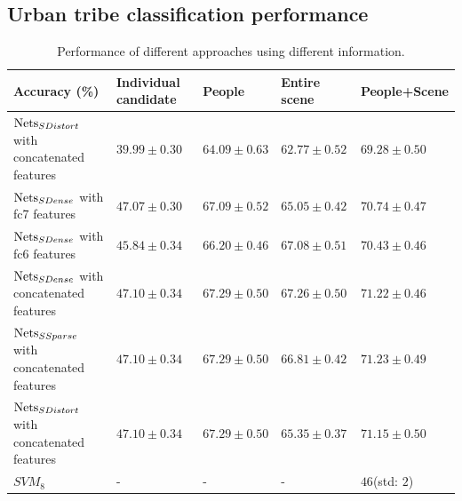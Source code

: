 \documentclass[10pt,twocolumn,letterpaper]{article}
\begin{document}
\subsection{Urban tribe classification performance}

\begin{table}[!t]
\centering
    \caption{Performance of different approaches using different information. }
    \label{table1}
    \begin{tabular}{l|l|l|l|l}
    \hline
    Accuracy (\%)                                          & Individual candidate & People & Entire scene & People+Scene \\ \hline

$\textup{Nets}_{SDistort}$   with concatenated features               & $39.99\pm0.30$                    & $64.09\pm0.63$      & $62.77\pm0.52$            & $69.28\pm0.50$            \\ \hline
    $\textup{Nets}_{SDense}$ with fc7 features & $47.07 \pm0.30$ & $67.09 \pm 0.52$      & $65.05 \pm0.42$            & $70.74\pm0.47$      \\ \hline
     $\textup{Nets}_{SDense}$ with fc6 features & $45.84 \pm0.34$ & $66.20 \pm 0.46$      & $67.08 \pm0.51$            & $70.43\pm0.46$      \\ \hline
     $\textup{Nets}_{SDense}$ with concatenated features     &  $\mathbf{47.10 \pm0.34}$ & $\mathbf{67.29 \pm 0.50}$      & $\mathbf{67.26 \pm0.50}$            & $71.22\pm0.46$      \\ \hline
    $\textup{Nets}_{SSparse}$ with concatenated features               & $\mathbf{47.10 \pm0.34}$                    &$\mathbf{67.29  \pm 0.50}$        & $66.81\pm0.42$            & $\mathbf{71.23\pm0.49}$            \\ \hline
    $\textup{Nets}_{SDistort}$ with concatenated features               &  $\mathbf{47.10 \pm0.34}$          &$\mathbf{67.29 \pm 0.50}$       & $65.35\pm0.37$            & $71.15\pm0.50$            \\ \hline
    $SVM_{8}$\cite{urbantribe2} & - & - & - & $46$(std: $2$)  \\ \hline


    \end{tabular}
\end{table}
\end{document}
